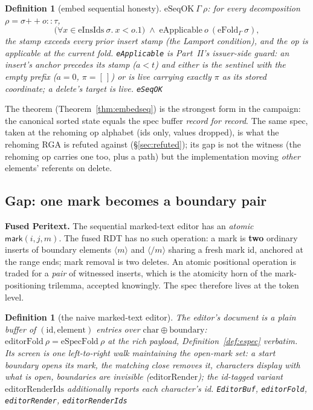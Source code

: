 \documentclass[11pt]{article}
\newtheorem{definition}[theorem]{Definition}
\newcommand{\lean}[1]{\texttt{#1}}
\begin{document}
\begin{definition}[embed sequential honesty]
\label{def:eseqok}
$\mathrm{eSeqOK}\ \Gamma\ \rho$: for every decomposition
$\rho = \sigma \mathbin{+\!\!+} o :: \tau$,
\[
  \bigl(\forall x \in \mathrm{eInsIds}\ \sigma.\ x < o.1\bigr)
  \;\wedge\;
  \mathrm{eApplicable}\ o\ (\mathrm{eFold}_\Gamma\ \sigma) ,
\]
the stamp exceeds every prior insert stamp (the Lamport condition),
and the op is applicable at the current fold. \lean{eApplicable} is
Part~II's issuer-side guard: an insert's anchor precedes its stamp
($a < t$) and either is the sentinel with the empty prefix ($a = 0$,
$\pi = [\,]$) or is live carrying exactly $\pi$ as its stored
coordinate; a delete's target is live.
\hfill\lean{eSeqOK}
\end{definition}

\noindent The theorem (Theorem~\ref{thm:embedseq}) is the strongest
form in the campaign: the canonical sorted state equals the spec
buffer \emph{record for record}. The same spec, taken at the rehoming
op alphabet (ids only, values dropped), is what the
rehoming RGA is refuted against (\S\ref{sec:refuted}); its gap is not
the witness (the rehoming op carries one too, plus a path) but the
implementation moving \emph{other} elements' referents on delete.

\subsection{Gap: one mark becomes a boundary pair}

\textbf{Fused Peritext.} The sequential marked-text editor has an
\emph{atomic} $\mathsf{mark}(i, j, m)$. The fused RDT has no such
operation: a mark is \textbf{two} ordinary inserts of boundary
elements $\langle m\rangle$ and $\langle/m\rangle$ sharing a fresh
mark id, anchored at the range ends; mark removal is two deletes. An
atomic positional operation is traded for a \emph{pair} of witnessed
inserts, which is the atomicity horn of the mark-positioning trilemma,
accepted knowingly. The spec therefore lives at the token level.

\begin{definition}[the naive marked-text editor]
\label{def:editor}
The editor's document is a plain buffer of
$(\mathrm{id}, \mathrm{element})$ entries over
$\mathrm{char} \oplus \mathrm{boundary}$:
$\mathrm{editorFold}\ \rho = \mathrm{eSpecFold}\ \rho$ at the rich
payload, Definition~\ref{def:espec} verbatim. Its screen is one
left-to-right walk maintaining the open-mark set: a start boundary
opens its mark, the matching close removes it, characters display
with what is open, boundaries are invisible
($\mathrm{editorRender}$); the id-tagged variant
$\mathrm{editorRenderIds}$ additionally reports each character's id.
\hfill\lean{EditorBuf}, \lean{editorFold}, \lean{editorRender},
\lean{editorRenderIds}
\end{definition}
\end{document}
